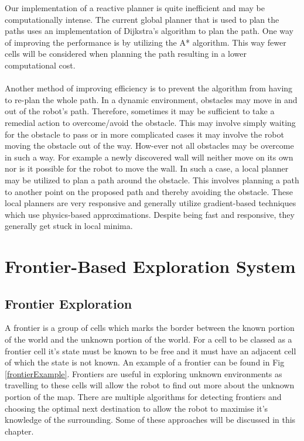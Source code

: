 \documentclass[a4paper,12pt]{article}
\begin{document}
			Our implementation of a reactive planner is quite inefficient and may be computationally intense. The current global planner that is used to plan the paths uses an implementation of Dijkstra's algorithm to plan the path. One way of improving the performance is by utilizing the A* algorithm. This way fewer cells will be considered when planning the path resulting in a lower computational cost.
			\\
			\\
			Another method of improving efficiency is to prevent the algorithm from having to re-plan the whole path. In a dynamic environment, obstacles may move in and out of the robot's path. Therefore, sometimes it may be sufficient to take a remedial action to overcome/avoid the obstacle. This may involve simply waiting for the obstacle to pass or in more complicated cases it may involve the robot moving the obstacle out of the way. How-ever not all obstacles may be overcome in such a way. For example a newly discovered wall will neither move on its own nor is it possible for the robot to move the wall. In such a case, a local planner may be utilized to plan a path around the obstacle. This involves planning a path to another point on the proposed path and thereby avoiding the obstacle. These local planners are very responsive and generally utilize gradient-based techniques which use physics-based approximations. Despite being fast and responsive, they generally get stuck in local minima. 
			
	
	\section{Frontier-Based Exploration System}

		\subsection{Frontier Exploration}

			A frontier is a group of cells which marks the border between the known portion of the world and the unknown portion of the world. For a cell to be classed as a frontier cell it's state must be known to be free and it must have an adjacent cell of which the state is not known. An example of a frontier can be found in Fig \ref{frontierExample}. Frontiers are useful in exploring unknown environments as travelling to these cells will allow the robot to find out more about the unknown portion of the map. There are multiple algorithms for detecting frontiers and choosing the optimal next destination to allow the robot to maximise it's knowledge of the surrounding. Some of these approaches will be discussed in this chapter.
\end{document}
